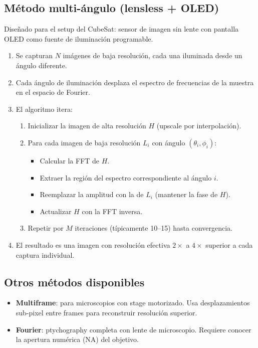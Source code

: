 \documentclass[11pt,a4paper]{article}
\begin{document}
\subsection{M\'{e}todo multi-\'{a}ngulo (lensless + OLED)}

Dise\~{n}ado para el setup del CubeSat: sensor de imagen sin lente con pantalla OLED como fuente de iluminaci\'{o}n programable.

\begin{enumerate}
  \item Se capturan $N$ im\'{a}genes de baja resoluci\'{o}n, cada una iluminada desde un \'{a}ngulo diferente.
  \item Cada \'{a}ngulo de iluminaci\'{o}n desplaza el espectro de frecuencias de la muestra en el espacio de Fourier.
  \item El algoritmo itera:
  \begin{enumerate}
    \item Inicializar la imagen de alta resoluci\'{o}n $H$ (upscale por interpolaci\'{o}n).
    \item Para cada imagen de baja resoluci\'{o}n $L_i$ con \'{a}ngulo $(\theta_i, \phi_i)$:
    \begin{itemize}
      \item Calcular la FFT de $H$.
      \item Extraer la regi\'{o}n del espectro correspondiente al \'{a}ngulo $i$.
      \item Reemplazar la amplitud con la de $L_i$ (mantener la fase de $H$).
      \item Actualizar $H$ con la FFT inversa.
    \end{itemize}
    \item Repetir por $M$ iteraciones (t\'{i}picamente 10--15) hasta convergencia.
  \end{enumerate}
  \item El resultado es una imagen con resoluci\'{o}n efectiva $2\times$ a $4\times$ superior a cada captura individual.
\end{enumerate}

\subsection{Otros m\'{e}todos disponibles}

\begin{itemize}
  \item \textbf{Multiframe}: para microscopios con stage motorizado. Usa desplazamientos sub-pixel entre frames para reconstruir resoluci\'{o}n superior.
  \item \textbf{Fourier}: ptychography completa con lente de microscopio. Requiere conocer la apertura num\'{e}rica (NA) del objetivo.
\end{itemize}
\end{document}
